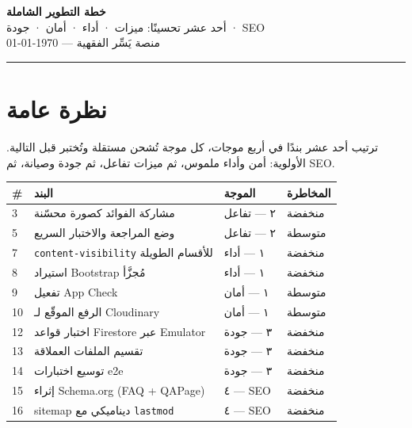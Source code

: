 \documentclass[11pt]{article}
\begin{document}
\begin{center}
  {\Huge\bfseries\color{gold} خطة التطوير الشاملة}\\[4pt]
  {\large\color{darkbg} أحد عشر تحسينًا: ميزات · أداء · أمان · جودة · SEO}\\[6pt]
  {\small\color{midgray} منصة يَسِّر الفقهية — \today}
\end{center}

\vspace{4pt}
\hrule
\vspace{10pt}

\section{نظرة عامة}

\begin{goalbox}
ترتيب أحد عشر بندًا في أربع موجات، كل موجة تُشحن مستقلة وتُختبر قبل التالية.
الأولوية: أمن وأداء ملموس، ثم ميزات تفاعل، ثم جودة وصيانة، ثم SEO.
\end{goalbox}

\vspace{6pt}
\renewcommand{\arraystretch}{1.35}
\begin{longtable}{@{}p{} p{} p{} p{}@{}}
\toprule
\textbf{\#} & \textbf{البند} & \textbf{الموجة} & \textbf{المخاطرة} \\
\midrule
\endhead
3  & مشاركة الفوائد كصورة محسّنة & ٢ — تفاعل & منخفضة \\
5  & وضع المراجعة والاختبار السريع & ٢ — تفاعل & متوسطة \\
7  & \texttt{content-visibility} للأقسام الطويلة & ١ — أداء & منخفضة \\
8  & استيراد Bootstrap مُجزَّأ & ١ — أداء & منخفضة \\
9  & تفعيل App Check & ١ — أمان & متوسطة \\
10 & الرفع الموقّع لـ Cloudinary & ١ — أمان & متوسطة \\
12 & اختبار قواعد Firestore عبر Emulator & ٣ — جودة & منخفضة \\
13 & تقسيم الملفات العملاقة & ٣ — جودة & منخفضة \\
14 & توسيع اختبارات e2e & ٣ — جودة & منخفضة \\
15 & إثراء Schema.org (FAQ + QAPage) & ٤ — SEO & منخفضة \\
16 & sitemap ديناميكي مع \texttt{lastmod} & ٤ — SEO & منخفضة \\
\bottomrule
\end{longtable}
\renewcommand{\arraystretch}{1.0}
\end{document}
